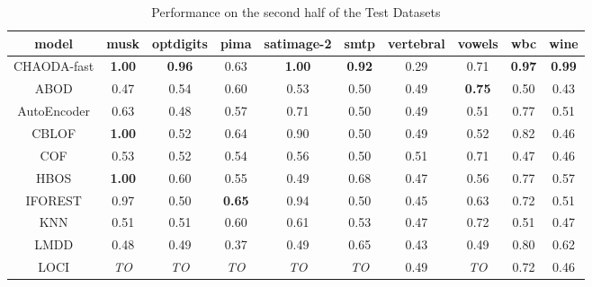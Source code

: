 \begin{table*}[!b]
\renewcommand{\arraystretch}{1.25}
\caption{Performance on the second half of the Test Datasets}
\label{table:results:test-performance-2}
\centering
\begin{tabular}{|c|c|c|c|c|c|c|c|c|c|}
\hline
\textbf{model} & \textbf{musk} & \textbf{optdigits} & \textbf{pima} & \textbf{satimage-2} & \textbf{smtp} & \textbf{vertebral} & \textbf{vowels} &  \textbf{wbc} & \textbf{wine} \\
\hline
    CHAODA-fast & \textbf{1.00} &      \textbf{0.96} &          0.63 &       \textbf{1.00} & \textbf{0.92} &               0.29 &            0.71 & \textbf{0.97} & \textbf{0.99} \\
\hline
            ABOD &          0.47 &               0.54 &          0.60 &                0.53 &          0.50 &               0.49 &   \textbf{0.75} &          0.50 &          0.43 \\
\hline
    AutoEncoder &          0.63 &               0.48 &          0.57 &                0.71 &          0.50 &               0.49 &            0.51 &          0.77 &          0.51 \\
\hline
            CBLOF & \textbf{1.00} &               0.52 &          0.64 &                0.90 &          0.50 &               0.49 &            0.52 &          0.82 &          0.46 \\
\hline
            COF &          0.53 &               0.52 &          0.54 &                0.56 &          0.50 &               0.51 &            0.71 &          0.47 &          0.46 \\
\hline
            HBOS & \textbf{1.00} &               0.60 &          0.55 &                0.49 &          0.68 &               0.47 &            0.56 &          0.77 &          0.57 \\
\hline
        IFOREST &          0.97 &               0.50 & \textbf{0.65} &                0.94 &          0.50 &               0.45 &            0.63 &          0.72 &          0.51 \\
\hline
            KNN &          0.51 &               0.51 &          0.60 &                0.61 &          0.53 &               0.47 &            0.72 &          0.51 &          0.47 \\
\hline
            LMDD &          0.48 &               0.49 &          0.37 &                0.49 &          0.65 &               0.43 &            0.49 &          0.80 &          0.62 \\
\hline
            LOCI &   \textit{TO} &        \textit{TO} &   \textit{TO} &         \textit{TO} &   \textit{TO} &               0.49 &     \textit{TO} &          0.72 &          0.46 \\

\end{tabular}
\end{table*}

